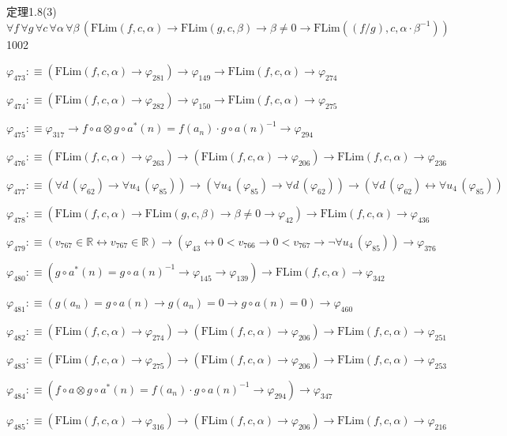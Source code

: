 \begin{fullproof}{定理1.8(3)}{$\forall f\,\forall g\,\forall c\,\forall \alpha\,\forall \beta\,(\mathrm{FLim}(f,c,\alpha) \to \mathrm{FLim}(g,c,\beta) \to \beta \neq 0 \to \mathrm{FLim}((f / g),c,\alpha \cdot \beta^{-1}))$}{1002}
\begin{abbrevlist}
\item $\varphi_{473} :\equiv (\mathrm{FLim}(f,c,\alpha) \to \varphi_{281}) \to \varphi_{149} \to \mathrm{FLim}(f,c,\alpha) \to \varphi_{274}$
\item $\varphi_{474} :\equiv (\mathrm{FLim}(f,c,\alpha) \to \varphi_{282}) \to \varphi_{150} \to \mathrm{FLim}(f,c,\alpha) \to \varphi_{275}$
\item $\varphi_{475} :\equiv \varphi_{317} \to f \circ a \otimes g \circ a^{\ast}(n) = f(a_{n}) \cdot g \circ a(n)^{-1} \to \varphi_{294}$
\item $\varphi_{476} :\equiv (\mathrm{FLim}(f,c,\alpha) \to \varphi_{263}) \to (\mathrm{FLim}(f,c,\alpha) \to \varphi_{206}) \to \mathrm{FLim}(f,c,\alpha) \to \varphi_{236}$
\item $\varphi_{477} :\equiv (\forall d\,(\varphi_{62}) \to \forall u_{4}\,(\varphi_{85})) \to (\forall u_{4}\,(\varphi_{85}) \to \forall d\,(\varphi_{62})) \to (\forall d\,(\varphi_{62}) \leftrightarrow \forall u_{4}\,(\varphi_{85}))$
\item $\varphi_{478} :\equiv (\mathrm{FLim}(f,c,\alpha) \to \mathrm{FLim}(g,c,\beta) \to \beta \neq 0 \to \varphi_{42}) \to \mathrm{FLim}(f,c,\alpha) \to \varphi_{436}$
\item $\varphi_{479} :\equiv (v_{767} \in \mathbb{R} \leftrightarrow v_{767} \in \mathbb{R}) \to (\varphi_{43} \leftrightarrow 0 < v_{766} \to 0 < v_{767} \to \neg \forall u_{4}\,(\varphi_{85})) \to \varphi_{376}$
\item $\varphi_{480} :\equiv (g \circ a^{\ast}(n) = g \circ a(n)^{-1} \to \varphi_{145} \to \varphi_{139}) \to \mathrm{FLim}(f,c,\alpha) \to \varphi_{342}$
\item $\varphi_{481} :\equiv (g(a_{n}) = g \circ a(n) \to g(a_{n}) = 0 \to g \circ a(n) = 0) \to \varphi_{460}$
\item $\varphi_{482} :\equiv (\mathrm{FLim}(f,c,\alpha) \to \varphi_{274}) \to (\mathrm{FLim}(f,c,\alpha) \to \varphi_{206}) \to \mathrm{FLim}(f,c,\alpha) \to \varphi_{251}$
\item $\varphi_{483} :\equiv (\mathrm{FLim}(f,c,\alpha) \to \varphi_{275}) \to (\mathrm{FLim}(f,c,\alpha) \to \varphi_{206}) \to \mathrm{FLim}(f,c,\alpha) \to \varphi_{253}$
\item $\varphi_{484} :\equiv (f \circ a \otimes g \circ a^{\ast}(n) = f(a_{n}) \cdot g \circ a(n)^{-1} \to \varphi_{294}) \to \varphi_{347}$
\item $\varphi_{485} :\equiv (\mathrm{FLim}(f,c,\alpha) \to \varphi_{316}) \to (\mathrm{FLim}(f,c,\alpha) \to \varphi_{206}) \to \mathrm{FLim}(f,c,\alpha) \to \varphi_{216}$

\end{abbrevlist}
\end{fullproof}
